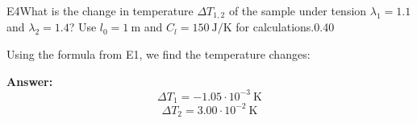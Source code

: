 \documentclass[11pt,a4paper]{article}
\begin{document}
\begin{solcard}{E4}{What is the change in temperature $\Delta T_{1,2}$ of the sample under tension $\lambda_1= 1.1$ and $\lambda_2 = 1.4$? Use $l_0 = 1~\text{m}$ and $C_l = 150~\text{J}/\text{K}$ for calculations.}{0.40}

Using the formula from E1, we find the temperature changes:

\par\smallskip\noindent\textbf{Answer:} \[\Delta T_1 = -1.05\cdot10^{-3}~\text{K}\]\[\Delta T_2 = 3.00\cdot10^{-2}~\text{K}\]
\end{solcard}
\end{document}
